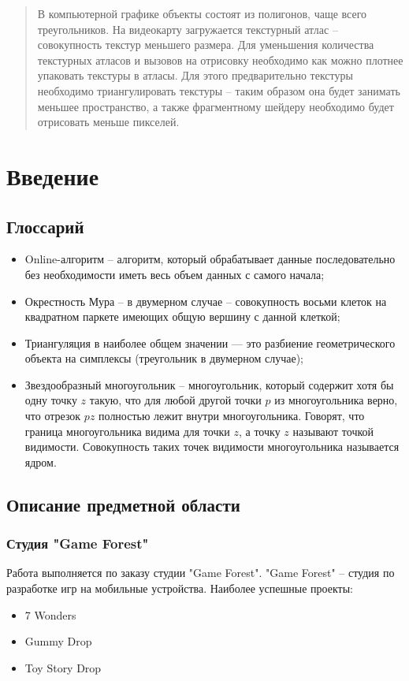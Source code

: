 \documentclass{fefu}
\author{Терехов Д.Е.}
\begin{document}
\tableofcontents
\pagebreak
\begin{abstract}
    В компьютерной графике объекты состоят из полигонов, чаще всего треугольников.
    На видеокарту загружается текстурный атлас -- совокупность текстур меньшего размера.
    Для уменьшения количества текстурных атласов и вызовов на отрисовку необходимо как можно плотнее упаковать
    текстуры в атласы. Для этого предварительно текстуры необходимо триангулировать текстуры -- таким образом
     она будет занимать меньшее пространство, а также фрагментному шейдеру необходимо будет отрисовать меньше пикселей.
\end{abstract}

\newpage
 \section{Введение}
\subsection{Глоссарий}
\begin{itemize}
    \item Online-алгоритм -- алгоритм, который обрабатывает данные последовательно без необходимости иметь весь объем
    данных с самого начала;
    \item Окрестность Мура -- в двумерном случае -- совокупность восьми клеток на квадратном паркете
    имеющих общую вершину с данной клеткой;
    \item Триангуляция в наиболее общем значении — это разбиение геометрического объекта на симплексы (треугольник в
    двумерном случае);
    \item Звездообразный многоугольник -- многоугольник, который содержит хотя бы одну точку $z$ такую, что для любой
    другой точки $p$ из многоугольника верно, что отрезок $pz$ полностью лежит внутри многоугольника. Говорят, что
    граница многоугольника видима для точки $z$, а точку $z$ называют точкой видимости. Совокупность
    таких точек видимости многоугольника называется ядром.
\end{itemize}
\subsection{Описание предметной области}
\subsubsection{Студия "Game Forest"}
Работа выполняется по заказу студии "Game Forest". "Game Forest" -- студия по разработке игр на мобильные устройства.
Наиболее успешные проекты:
\begin{itemize}
    \item 7 Wonders
    \item Gummy Drop
    \item Toy Story Drop
\end{itemize}
\end{document}
